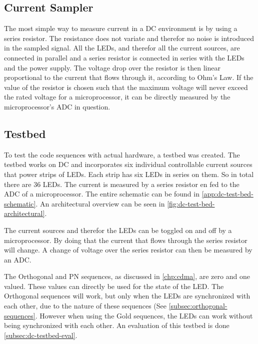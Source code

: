 








\subsection{Current Sampler}

The most simple way to measure current in a DC environment is by using a series resistor.
The resistance does not variate and therefor no noise is introduced in the sampled signal.
All the LEDs, and therefor all the current sources, are connected in parallel and a series resistor is connected in series with the LEDs and the power supply.
The voltage drop over the resistor is then linear proportional to the current that flows through it, according to Ohm's Law.
If the value of the resistor is chosen such that the maximum voltage will never exceed the rated voltage for a microprocessor, it can be directly measured by the microprocessor's ADC in question.









\subsection{Testbed}
\label{subsec:dc-testbed}

To test the code sequences with actual hardware, a testbed was created.
The testbed works on DC and incorporates six individual controllable current sources that power strips of LEDs.
Each strip has six LEDs in series on them.
So in total there are 36 LEDs.
The current is measured by a series resistor en fed to the ADC of a microprocessor.
The entire schematic can be found in \autoref{app:dc-test-bed-schematic}. 
An architectural overview can be seen in \autoref{fig:dc-test-bed-architectural}.


The current sources and therefor the LEDs can be toggled on and off by a microprocessor.
By doing that the current that flows through the series resistor will change.
A change of voltage over the series resistor can then be measured by an ADC.


The Orthogonal and PN sequences, as discussed in \autoref{chp:cdma}, are zero and one valued.
These values can directly be used for the state of the LED.
The Orthogonal sequences will work, but only when the LEDs are synchronized with each other, due to the nature of these sequences (See \autoref{subsec:orthogonal-sequences}.
However when using the Gold sequences, the LEDs can work without being synchronized with each other.
An evaluation of this testbed is done \autoref{subsec:dc-testbed-eval}.

